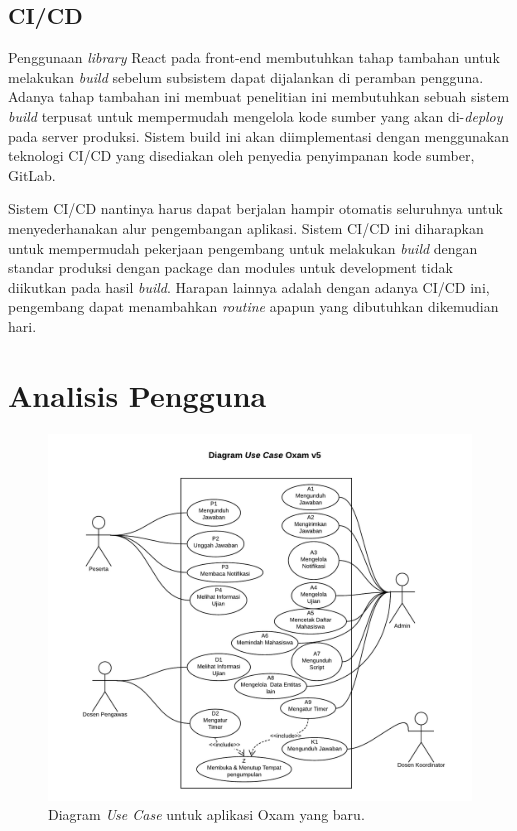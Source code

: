 \subsection{CI/CD}
    Penggunaan \textit{library} React pada front-end membutuhkan tahap tambahan
    untuk melakukan \textit{build} sebelum subsistem dapat dijalankan di
    peramban pengguna. Adanya tahap tambahan ini membuat penelitian ini
    membutuhkan sebuah sistem \textit{build} terpusat untuk mempermudah
    mengelola kode sumber yang akan di-\textit{deploy} pada server produksi.
    Sistem build ini akan diimplementasi dengan menggunakan teknologi CI/CD yang
    disediakan oleh penyedia penyimpanan kode sumber, GitLab.
    
    Sistem CI/CD nantinya harus dapat berjalan hampir otomatis seluruhnya untuk
    menyederhanakan alur pengembangan aplikasi. Sistem CI/CD ini diharapkan
    untuk mempermudah pekerjaan pengembang untuk melakukan \textit{build} dengan
    standar produksi dengan package dan modules untuk development tidak
    diikutkan pada hasil \textit{build}. Harapan lainnya adalah dengan adanya
    CI/CD ini, pengembang dapat menambahkan \textit{routine} apapun yang
    dibutuhkan dikemudian hari.

\section{Analisis Pengguna}
\begin{figure}[thb]
    \centering
    \includegraphics[width=0.6\paperwidth]{Gambar/UseCase - RevB.pdf}
    \caption{Diagram \textit{Use Case} untuk aplikasi Oxam yang baru.}
    \label{fig:diagram_usecase}
\end{figure}

